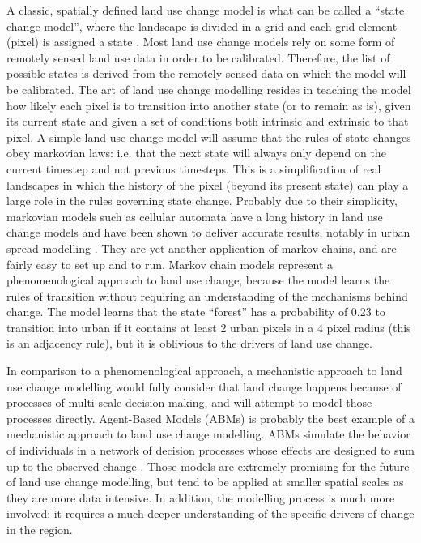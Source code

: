 A classic, spatially defined land use change model is what can be called a “state change model”, where the landscape is divided in a grid and each grid element (pixel) is assigned a state \citep{daniel_state-and-transition_2016}. Most land use change models rely on some form of remotely sensed land use data in order to be calibrated. Therefore, the list of possible states is derived from the remotely sensed data on which the model will be calibrated. The art of land use change modelling resides in teaching the model how likely each pixel is to transition into another state (or to remain as is), given its current state and given a set of conditions both intrinsic and extrinsic to that pixel. A simple land use change model will assume that the rules of state changes obey markovian laws: i.e. that the next state will always only depend on the current timestep and not previous timesteps. This is a simplification of real landscapes in which the history of the pixel (beyond its present state) can play a large role in the rules governing state change. Probably due to their simplicity, markovian models such as cellular automata have a long history in land use change models and have been shown to deliver accurate results, notably in urban spread modelling \citep{soares-filho_dinamicastochastic_2002, jokar_arsanjani_integration_2013, iacono_markov_2015}. They are yet another application of markov chains, and are fairly easy to set up and to run. Markov chain models represent a phenomenological approach to land use change, because the model learns the rules of transition without requiring an understanding of the mechanisms behind change. The model learns that the state “forest” has a probability of 0.23 to transition into urban if it contains at least 2 urban pixels in a 4 pixel radius (this is an adjacency rule), but it is oblivious to the drivers of land use change.

In comparison to a phenomenological approach, a mechanistic approach to land use change modelling would fully consider that land change happens because of processes of multi-scale decision making, and will attempt to model those processes directly. Agent-Based Models (ABMs) is probably the best example of a mechanistic approach to land use change modelling. ABMs simulate the behavior of individuals in a network of decision processes whose effects are designed to sum up to the observed change \citep{parker_agent-based_2002, filatova_spatial_2013}. Those models are extremely promising for the future of land use change modelling, but tend to be applied at smaller spatial scales as they are more data intensive. In addition, the modelling process is much more involved: it requires a much deeper understanding of the specific drivers of change in the region.

